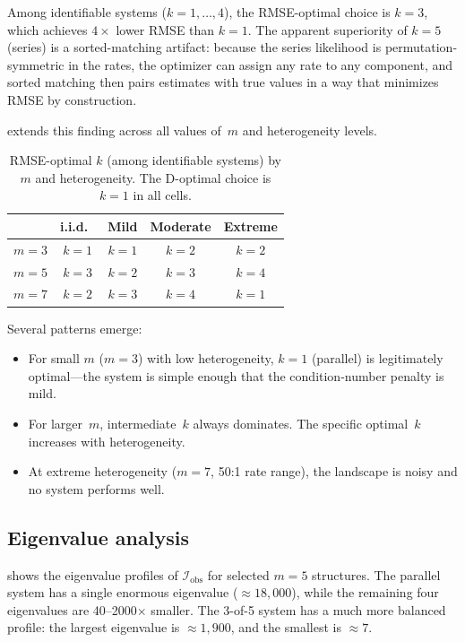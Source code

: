 \documentclass[12pt]{article}
\theoremstyle{definition}
\theoremstyle{remark}
\begin{document}
Among identifiable systems ($k = 1, \ldots, 4$), the RMSE-optimal
choice is $k = 3$, which achieves $4\times$ lower RMSE than $k = 1$.
The apparent superiority of $k = 5$ (series) is a sorted-matching
artifact: because the series likelihood is permutation-symmetric in
the rates, the optimizer can assign any rate to any component, and
sorted matching then pairs estimates with true values in a way that
minimizes RMSE by construction.

 extends this finding across all values
of~$m$ and heterogeneity levels.

\begin{table}[htbp]
  \centering
  \caption{RMSE-optimal $k$ (among identifiable systems) by $m$ and
    heterogeneity.  The D-optimal choice is $k = 1$ in all cells.}
  \label{tab:optimal_k_all}
  \begin{tabular}{lcccc}
    \toprule
    & i.i.d.\ & Mild & Moderate & Extreme \\
    \midrule
    $m = 3$ & $k = 1$ & $k = 1$ & $k = 2$ & $k = 2$ \\
    $m = 5$ & $k = 3$ & $k = 2$ & $k = 3$ & $k = 4$ \\
    $m = 7$ & $k = 2$ & $k = 3$ & $k = 4$ & $k = 1$ \\
    \bottomrule
  \end{tabular}
\end{table}

Several patterns emerge:
\begin{itemize}
  \item For small $m$ ($m = 3$) with low heterogeneity, $k = 1$
    (parallel) is legitimately optimal---the system is simple enough
    that the condition-number penalty is mild.
  \item For larger~$m$, intermediate~$k$ always dominates.  The
    specific optimal~$k$ increases with heterogeneity.
  \item At extreme heterogeneity ($m = 7$, 50:1 rate range), the
    landscape is noisy and no system performs well.
\end{itemize}

\subsection{Eigenvalue analysis}
\label{sec:res_eigen}

 shows the eigenvalue profiles of
$\mathcal{I}_{\mathrm{obs}}$ for selected $m = 5$ structures.  The
parallel system has a single enormous eigenvalue ($\approx
18{,}000$), while the remaining four eigenvalues are 40--2000$\times$
smaller.  The 3-of-5 system has a much more balanced profile: the
largest eigenvalue is $\approx 1{,}900$, and the smallest is
$\approx 7$.
\end{document}
